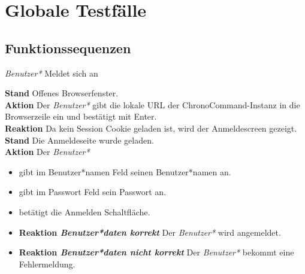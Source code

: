 \section{Globale Testfälle}

\subsection{Funktionssequenzen}
\begin{requirements}
	 \emph{Benutzer*} Meldet sich an
	\begin{requirements}
  			    \textbf{Stand} Offenes Browserfenster. \\
  			    \textbf{Aktion} Der \emph{Benutzer*} gibt die lokale URL der ChronoCommand-Instanz in die Browserzeile ein und bestätigt mit Enter. \\
  			    \textbf{Reaktion} Da kein Session Cookie geladen ist, wird der Anmeldescreen gezeigt.
  			    \textbf{Stand} Die Anmeldeseite wurde geladen.\\
                \textbf{Aktion} Der \emph{Benutzer*}
                    \begin{itemize}
                        \item gibt im Benutzer*namen Feld seinen Benutzer*namen an.
                        \item gibt im Passwort Feld sein Passwort an.
                        \item betätigt die Anmelden Schaltfläche.
                    \end{itemize}
                \begin{itemize}
			\item \textbf{Reaktion \emph{Benutzer*daten korrekt}} Der \emph{Benutzer*} wird angemeldet.
			\item \textbf{Reaktion \emph{Benutzer*daten nicht korrekt}} Der \emph{Benutzer*} bekommt eine Fehlermeldung.
                \end{itemize}


\end{requirements}
\end{requirements}
